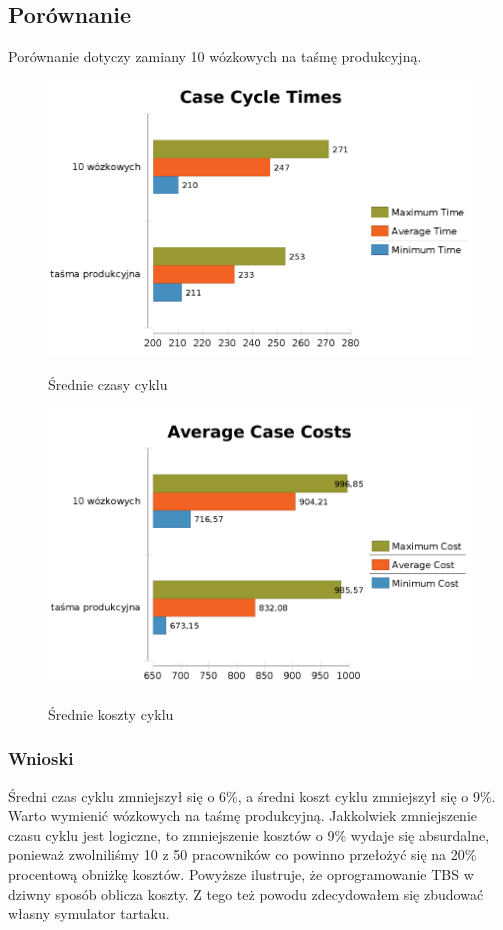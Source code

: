 \documentclass[a4paper]{article}
\begin{document}
\subsection{Porównanie}
Porównanie dotyczy zamiany 10 wózkowych na taśmę produkcyjną.
\begin{figure}[H]
\centering
\includegraphics[scale=0.3]{img/case-times.png}
\label{img:cost}
\caption{Średnie czasy cyklu}
\end{figure}
\begin{figure}[H]
\centering
\includegraphics[scale=0.3]{img/case-cost.png}
\label{img:cost}
\caption{Średnie koszty cyklu}
\end{figure}
\subsubsection{Wnioski}
Średni czas cyklu zmniejszył się o 6\%, a średni koszt cyklu zmniejszył się o 9\%. Warto wymienić wózkowych na taśmę produkcyjną. Jakkolwiek zmniejszenie czasu cyklu jest logiczne, to zmniejszenie kosztów o 9\% wydaje się absurdalne, ponieważ zwolniliśmy 10 z 50 pracowników co powinno przełożyć się na 20\% procentową obniżkę kosztów. Powyższe ilustruje, że oprogramowanie TBS w dziwny sposób oblicza koszty. Z tego też powodu zdecydowałem się zbudować własny symulator tartaku.
\end{document}
